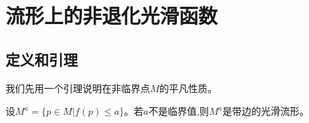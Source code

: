 \ifx\allfiles\undefined

	
	
\else
\fi
\chapter{流形上的非退化光滑函数}
\section{定义和引理}
我们先用一个引理说明在非临界点$M$的平凡性质。
\begin{lemma}{}
	设$M^a=\{p\in M|f(p)\leq a\}$。若$a$不是临界值,则$M^a$是带边的光滑流形。
\end{lemma}
\ifx\allfiles\undefined
	
	
	
	
	\else
	\fi
